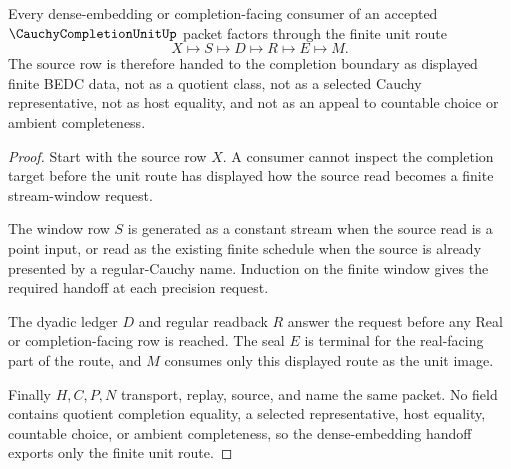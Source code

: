 \begin{theorem}
\label{thm:cauchy-completion-unit-dense-embedding-handoff}
Every dense-embedding or completion-facing consumer of an accepted $\CauchyCompletionUnitUp$ packet factors through the finite unit route
$$
X\longmapsto S\longmapsto D\longmapsto R\longmapsto E\longmapsto M .
$$
The source row is therefore handed to the completion boundary as displayed finite BEDC data, not as a quotient class, not as a selected Cauchy representative, not as host equality, and not as an appeal to countable choice or ambient completeness.
\end{theorem}
\begin{proof}
Start with the source row $X$. A consumer cannot inspect the completion target before the unit route has displayed how the source read becomes a finite stream-window request.

The window row $S$ is generated as a constant stream when the source read is a point input, or read as the existing finite schedule when the source is already presented by a regular-Cauchy name. Induction on the finite window gives the required handoff at each precision request.

The dyadic ledger $D$ and regular readback $R$ answer the request before any Real or completion-facing row is reached. The seal $E$ is terminal for the real-facing part of the route, and $M$ consumes only this displayed route as the unit image.

Finally $H,C,P,N$ transport, replay, source, and name the same packet. No field contains quotient completion equality, a selected representative, host equality, countable choice, or ambient completeness, so the dense-embedding handoff exports only the finite unit route.
\end{proof}

